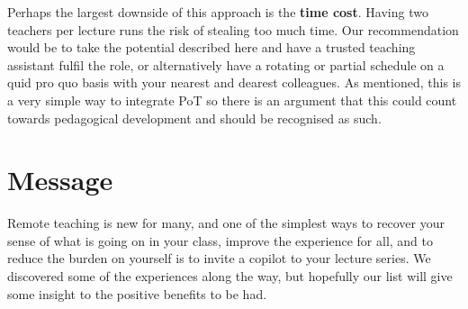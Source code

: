 \documentclass{article}
\begin{document}
Perhaps the largest downside of this approach is the \textbf{time cost}. Having two teachers per lecture runs the risk of stealing too much time. Our recommendation would be to take the potential described here and have a trusted teaching assistant fulfil the role, or alternatively have a rotating or partial schedule on a quid pro quo basis with your nearest and dearest colleagues. As mentioned, this is a very simple way to integrate PoT so there is an argument that this could count towards pedagogical development and should be recognised as such.

\section*{Message}
Remote teaching is new for many, and one of the simplest ways to recover your sense of what is going on in your class, improve the experience for all, and to reduce the burden on yourself is to invite a copilot to your lecture series. We discovered some of the experiences along the way, but hopefully our list will give some insight to the positive benefits to be had.



\end{document}
